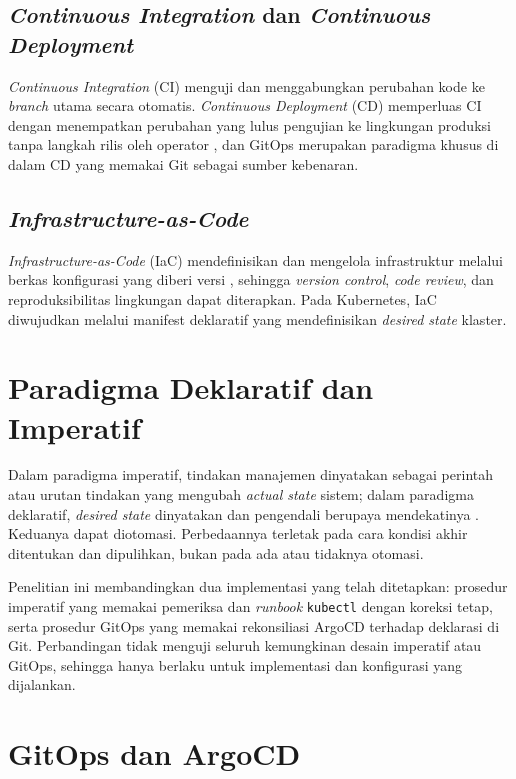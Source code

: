 \subsection{\textit{Continuous Integration} dan \textit{Continuous Deployment}}
\textit{Continuous Integration} (CI) menguji dan menggabungkan perubahan kode ke \textit{branch} utama secara otomatis. \textit{Continuous Deployment} (CD) memperluas CI dengan menempatkan perubahan yang lulus pengujian ke lingkungan produksi tanpa langkah rilis oleh operator \citep{humble2010continuous}, dan GitOps merupakan paradigma khusus di dalam CD yang memakai Git sebagai sumber kebenaran.

\subsection{\textit{Infrastructure-as-Code}}
\textit{Infrastructure-as-Code} (IaC) mendefinisikan dan mengelola infrastruktur melalui berkas konfigurasi yang diberi versi \citep{morris2020iac}, sehingga \textit{version control}, \textit{code review}, dan reproduksibilitas lingkungan dapat diterapkan. Pada Kubernetes, IaC diwujudkan melalui manifest deklaratif yang mendefinisikan \textit{desired state} klaster.

\section{Paradigma Deklaratif dan Imperatif}

Dalam paradigma imperatif, tindakan manajemen dinyatakan sebagai perintah atau urutan tindakan yang mengubah \textit{actual state} sistem; dalam paradigma deklaratif, \textit{desired state} dinyatakan dan pengendali berupaya mendekatinya \citep{scott2015plp}. Keduanya dapat diotomasi. Perbedaannya terletak pada cara kondisi akhir ditentukan dan dipulihkan, bukan pada ada atau tidaknya otomasi.

Penelitian ini membandingkan dua implementasi yang telah ditetapkan: prosedur imperatif yang memakai pemeriksa dan \textit{runbook} \texttt{kubectl} dengan koreksi tetap, serta prosedur GitOps yang memakai rekonsiliasi ArgoCD terhadap deklarasi di Git. Perbandingan tidak menguji seluruh kemungkinan desain imperatif atau GitOps, sehingga hanya berlaku untuk implementasi dan konfigurasi yang dijalankan.

\section{GitOps dan ArgoCD}

